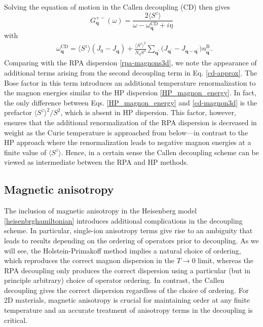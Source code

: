 \documentclass[aps,prb,reprint,floatfix,superscriptaddress]{revtex4-2}
\begin{document}
Solving the equation  of motion in the Callen decoupling (CD) then gives
\begin{equation}\label{G_cd}
    G_{\mathbf{q}}^{+-}(\omega)=\frac{2\langle S^z\rangle}{\omega-\omega^\mathrm{CD}_\mathbf{q}+i\eta}
\end{equation}
with
\begin{align}\label{cd-magnon3d}
    &\omega^\mathrm{CD}_{\mathbf{q}} = \langle S^z \rangle (J_0  - J_{\mathbf{q}} ) + \frac{\langle S^z\rangle^2}{N_qS^2} \sum_{\mathbf{q}^\prime} \bigl(J_{{\mathbf{q}}^\prime} - J_{\mathbf{q} - {\mathbf{q}}^\prime} \bigr) n^\mathrm{B}_{{\mathbf{q}}^\prime}.
\end{align}
Comparing with the RPA dispersion \eqref{rpa-magnons3d}, we note the appearance of additional terms arising from the second decoupling term in Eq. \eqref{cd-approx}. The Bose factor in this term introduces an additional temperature renormalization to the magnon energies similar to the HP dispersion \eqref{HP_magnon_energy}. In fact, the only difference between Eqs. \eqref{HP_magnon_energy} and \eqref{cd-magnon3d} is the prefactor $\langle S^z\rangle^2/S^2$, which is absent in HP dispersion. This factor, however, ensures %
that the additional renormalization of the RPA dispersion is decreased in weight
as the Curie temperature is approached from below---in contrast to the HP approach where the renormalization leads to negative magnon energies at a finite value of $\langle S^z\rangle$. Hence, in a certain sense the Callen decoupling scheme can be viewed as intermediate between the RPA and HP methods.

\subsection{Magnetic anisotropy}\label{subsec:2Dmagnon}
The inclusion of magnetic anisotropy in the Heisenberg model \eqref{heisenbrghamiltonian} introduces additional complications in the decoupling scheme. In particular, single-ion anisotropy terms give rise to an ambiguity that leads to results depending on the ordering of operators prior to decoupling. As we will see, the Holstein-Primakoff method implies a natural choice of ordering, which reproduces the correct magnon dispersion in the $T\rightarrow0$ limit, whereas the RPA decoupling only produces the correct dispersion using a particular (but in principle arbitrary) choice of operator ordering. In contrast, the Callen decoupling gives the correct dispersion regardless of the choice of ordering. For 2D materials, magnetic anisotropy is crucial for maintaining order at any finite temperature and an accurate treatment of anisotropy terms in the decoupling is critical.
\end{document}

